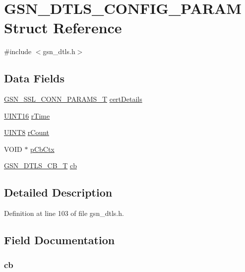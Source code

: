 \hypertarget{a00056}{
\section{GSN\_\-DTLS\_\-CONFIG\_\-PARAM Struct Reference}
\label{a00056}
}


{\ttfamily \#include $<$gsn\_\-dtls.h$>$}

\subsection*{Data Fields}
\begin{DoxyCompactItemize}
\item 
\hyperlink{a00242}{GSN\_\-SSL\_\-CONN\_\-PARAMS\_\-T} \hyperlink{a00056_a5000a356346b9a069211acdb422a1353}{certDetails}
\item 
\hyperlink{a00660_ga09f1a1fb2293e33483cc8d44aefb1eb1}{UINT16} \hyperlink{a00056_aaf93463b79d7a5e2afa4a3849a564ba2}{rTime}
\item 
\hyperlink{a00660_gab27e9918b538ce9d8ca692479b375b6a}{UINT8} \hyperlink{a00056_a4e6d43234fc23c311a827ca792a06f39}{rCount}
\item 
VOID $\ast$ \hyperlink{a00056_a040e2d4627baec5f0f81086400c1b66a}{pCbCtx}
\item 
\hyperlink{a00487_a5d2b26f5083cf0fda1a5356fe26ad9c3}{GSN\_\-DTLS\_\-CB\_\-T} \hyperlink{a00056_a027e6443bb2199b98001953fdd15eff2}{cb}
\end{DoxyCompactItemize}


\subsection{Detailed Description}


Definition at line 103 of file gsn\_\-dtls.h.



\subsection{Field Documentation}
\hypertarget{a00056_a027e6443bb2199b98001953fdd15eff2}{
\subsubsection[{cb}]{ {\bf cb}}}
\label{a00056_a027e6443bb2199b98001953fdd15eff2}


